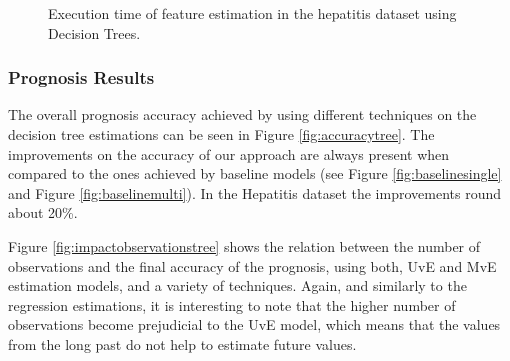 \begin{figure}[h]
	\begin{subfigmatrix}{2}
	\end{subfigmatrix}
	\caption{Execution time of feature estimation in the hepatitis dataset using Decision Trees.}
	\label{fig:estimationtimetree}
\end{figure}


\subsubsection{Prognosis Results}
\label{subsubsection:prognosis_dt}

The overall prognosis accuracy achieved by using different techniques on the decision tree estimations can be seen in Figure \ref{fig:accuracytree}.
The improvements on the accuracy of our approach are always present when compared to the ones achieved by baseline models 
(see Figure \ref{fig:baselinesingle} and Figure \ref{fig:baselinemulti}). In the Hepatitis dataset the improvements round about 20\%.

Figure \ref{fig:impactobservationstree} shows the relation between the number of observations and the final accuracy of the prognosis, using both, UvE and MvE estimation models, and a variety of techniques. Again, and similarly to the regression estimations, it is interesting to note that the higher number of observations become prejudicial to the UvE model, which means that the values from the long past do not help to estimate future values. 

